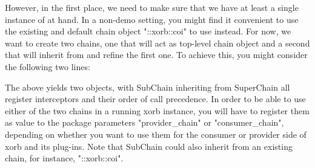 However, in the first place, we need to make sure that we have at least a single instance of   at hand. In a non-demo setting, you might find it convenient to use the existing and default chain object "::xorb::coi" to use instead. For now, we want to create two chains, one that will act as top-level chain object and a second that will inherit from and refine the first one. To achieve this, you might consider the following two lines:
%
\lstset{breaklines=true,numbers=none,basicstyle=\footnotesize,frame=single}

%
The above yields two objects, with SubChain inheriting from SuperChain all register interceptors and their order of call precedence. In order to be able to use either of the two chains in a running xorb instance, you will have to register them as value to the package parameters "provider\_chain" or "consumer\_chain", depending on whether you want to use them for the consumer or provider side of xorb and its plug-ins. Note that SubChain could also inherit from an existing chain, for instance, "::xorb::coi".
%
